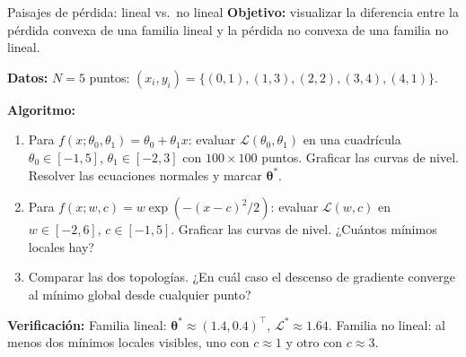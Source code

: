 \begin{ejerciciocomp}{Paisajes de pérdida: lineal vs.\ no lineal}
\label{ejcomp:paisajes}
\textbf{Objetivo:} visualizar la diferencia entre la pérdida convexa de
una familia lineal y la pérdida no convexa de una familia no lineal.

\medskip\noindent\textbf{Datos:}
$N = 5$ puntos: $(x_i, y_i) = \{(0,1),(1,3),(2,2),(3,4),(4,1)\}$.

\medskip\noindent\textbf{Algoritmo:}
\begin{enumerate}
  \item Para $f(x;\theta_0,\theta_1) = \theta_0 + \theta_1 x$:
        evaluar $\mathcal{L}(\theta_0,\theta_1)$ en una cuadrícula
        $\theta_0 \in [-1,5]$, $\theta_1 \in [-2,3]$ con $100 \times
        100$ puntos. Graficar las curvas de nivel. Resolver las
        ecuaciones normales y marcar $\bm{\theta}^*$.
  \item Para $f(x;w,c) = w \exp(-(x-c)^2/2)$:
        evaluar $\mathcal{L}(w,c)$ en $w \in [-2,6]$, $c \in [-1,5]$.
        Graficar las curvas de nivel. ¿Cuántos mínimos locales hay?
  \item Comparar las dos topologías. ¿En cuál caso el descenso de
        gradiente converge al mínimo global desde cualquier punto?
\end{enumerate}

\medskip\noindent\textbf{Verificación:}
Familia lineal: $\bm{\theta}^* \approx (1.4, 0.4)^\top$,
$\mathcal{L}^* \approx 1.64$.
Familia no lineal: al menos dos mínimos locales visibles, uno con
$c \approx 1$ y otro con $c \approx 3$.
\end{ejerciciocomp}

